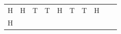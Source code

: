 {\begin{tabular}[t]{|l|l|l|l|l|l|l|l|l|l|}
        H &
    
    
        H &
    
    
        T &
    
    
        T &
    
    
        H &
    
    
        T &
    
    
        T &
    
    
        H%
     \tabularnewline\cline{1-1}\cline{2-2}\cline{3-3}\cline{4-4}\cline{5-5}\cline{6-6}\cline{7-7}\cline{8-8}\cline{9-9}\cline{10-10}
    
    
        H &
    

\end{tabular}}
